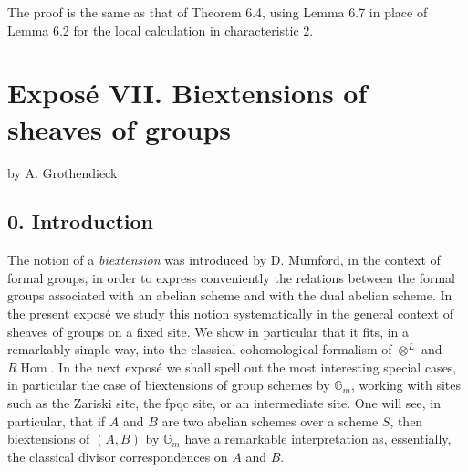 \documentclass[11pt]{article}
\providecommand{\Gm}{\mathbb G_m}
\providecommand{\pr}{\operatorname{pr}}
\providecommand{\Ens}{\mathrm{Ens}}
\providecommand{\id}{\operatorname{id}}
\begin{document}
The proof is the same as that of Theorem 6.4, using Lemma 6.7 in place of Lemma 6.2 for the local calculation in characteristic \(2\).



\providecommand{\cU}{\mathcal U}
\providecommand{\T}{\mathcal T}
\providecommand{\e}{\mathrm e}
\providecommand{\Ens}{\operatorname{Ens}}
\providecommand{\Alg}{\operatorname{Alg}}
\providecommand{\Homens}{\operatorname{Hom}_{\mathrm{ens}}}
\providecommand{\Homalg}{\operatorname{Hom}_{\mathrm{alg}}}
\providecommand{\Hompt}{\operatorname{Hom}_{\mathrm{pt}}}
\providecommand{\EXT}{\operatorname{EXT}}
\providecommand{\TORS}{\operatorname{TORS}}
\providecommand{\BITORSRIG}{\operatorname{BITORSRIG}}
\providecommand{\BITORSBIRIG}{\operatorname{BITORSBIRIG}}
\providecommand{\BITORS}{\operatorname{BITORS}}
\providecommand{\pr}{\operatorname{pr}}
\providecommand{\id}{\mathrm{id}}
\providecommand{\sym}{\mathrm{sym}}
\providecommand{\h}{\mathrm h}
\providecommand{\cA}{\mathcal A}
\providecommand{\cB}{\mathcal B}


\section*{Exposé VII. Biextensions of sheaves of groups}
\begin{center}
by A. Grothendieck
\end{center}

\subsection*{0. Introduction}

The notion of a \emph{biextension} was introduced by D. Mumford, in the context of formal groups, in order to express conveniently the relations between the formal groups associated with an abelian scheme and with the dual abelian scheme.  In the present exposé we study this notion systematically in the general context of sheaves of groups on a fixed site.  We show in particular that it fits, in a remarkably simple way, into the classical cohomological formalism of \(\otimes^{L}\) and \(R\!\operatorname{Hom}\).  In the next exposé we shall spell out the most interesting special cases, in particular the case of biextensions of group schemes by \(\Gm\), working with sites such as the Zariski site, the fpqc site, or an intermediate site.  One will see, in particular, that if \(A\) and \(B\) are two abelian schemes over a scheme \(S\), then biextensions of \((A,B)\) by \(\Gm\) have a remarkable interpretation as, essentially, the classical divisor correspondences on \(A\) and \(B\).
\end{document}
